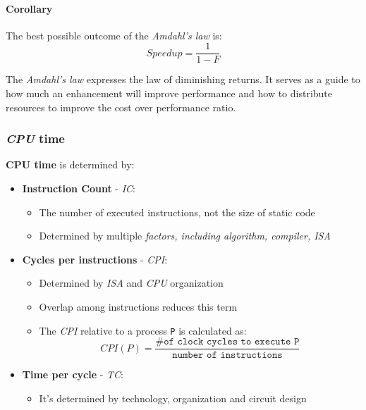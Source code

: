 \documentclass[english]{article}
\begin{document}
\paragraph{Corollary}

The best possible outcome of the \textit{Amdahl's law} is:
\[ Speedup = \dfrac{1}{1 - F} \]


The \textit{Amdahl's law} expresses the law of diminishing returns.
It serves as a guide to how much an enhancement will improve performance and how to distribute resources to improve the cost over performance ratio.

\subsubsection{\textit{CPU} time}

\textbf{CPU time} is determined by:

\begin{itemize}
  \item \textbf{Instruction Count} - \textit{IC}:
        \begin{itemize}
          \item The number of executed instructions, not the size of static code
          \item Determined by multiple \textit{factors, including algorithm, compiler, ISA}
        \end{itemize}
  \item \textbf{Cycles per instructions} - \textit{CPI}:
        \begin{itemize}
          \item Determined by \textit{ISA} and \textit{CPU} organization
          \item Overlap among instructions reduces this term
          \item The \textit{CPI} relative to a process \texttt{P} is calculated as:
                \[ CPI(P) = \dfrac{\texttt{\# of clock cycles to execute P}}{\texttt{number of instructions}} \]
        \end{itemize}
  \item \textbf{Time per cycle} - \textit{TC}:
        \begin{itemize}
          \item It's determined by technology, organization and circuit design
        \end{itemize}
\end{itemize}
\end{document}
